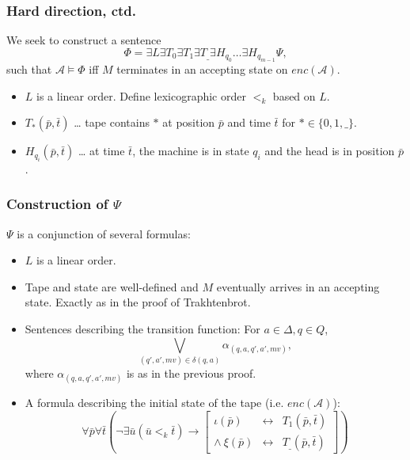 \documentclass[handout]{beamer}
\newcommand{\A}{\mathcal{A}}
\begin{document}
\begin{frame}
	\frametitle{Hard direction, ctd.}
	We seek to construct a sentence
	\begin{equation*}
	Φ = ∃L ∃T_0 ∃T_1 ∃T_{\_} ∃H_{q_0} … ∃H_{q_{m-1}} Ψ,
	\end{equation*}
	such that $\A \vDash Φ$ iff $M$ terminates in an accepting state on $enc(\A)$.
	
	\medskip
	
	
	\medskip
	
	\begin{itemize}
	\item<3-> $L$ is a linear order. Define lexicographic order $<_k$ based on $L$.
	\item<4-> $T_{*}(\bar{p}, \bar{t})$ … tape contains $*$ at position $\bar{p}$ and time $\bar{t}$ for $* ∈ \{0, 1, \_\}$.
	\item<5-> $H_{q_i}(\bar{p},\bar{t})$ … at time $\bar{t}$, the machine is in state $q_{i}$ and the head is in position $\bar{p}$.
	\end{itemize}
\end{frame}

\begin{frame}
	\frametitle{Construction of $Ψ$}
	$Ψ$ is a conjunction of several formulas:
	\begin{itemize}
		\item<2-> $L$ is a linear order.
		\item<3-> Tape and state are well-defined and $M$ eventually arrives in an accepting state. Exactly as in the proof of Trakhtenbrot.
		\item<4-> Sentences describing the transition function: For $a ∈ Δ, q ∈ Q$,
		\begin{equation*}
		\bigvee_{(q',a',mv) ∈ δ(q,a)} α_{(q,a,q',a',mv)},
		\end{equation*}
		where $α_{(q,a,q',a',mv)}$ is as in the previous proof.
		\item<5-> A formula describing the initial state of the tape (i.e. $enc(\A)$):
		\begin{equation*}
		∀\bar{p}∀\bar{t}\left(¬∃\bar{u} (\bar{u} <_k \bar{t}) → \left[
		\begin{array}{rcl}
		ι(\bar{p})&\leftrightarrow&T_1(\bar{p},\bar{t})\\
		∧\ ξ(\bar{p})&\leftrightarrow&T_{\_}(\bar{p},\bar{t})
		\end{array}		
		\right]\right)
		\end{equation*}
	\end{itemize}
\end{frame}
\end{document}
